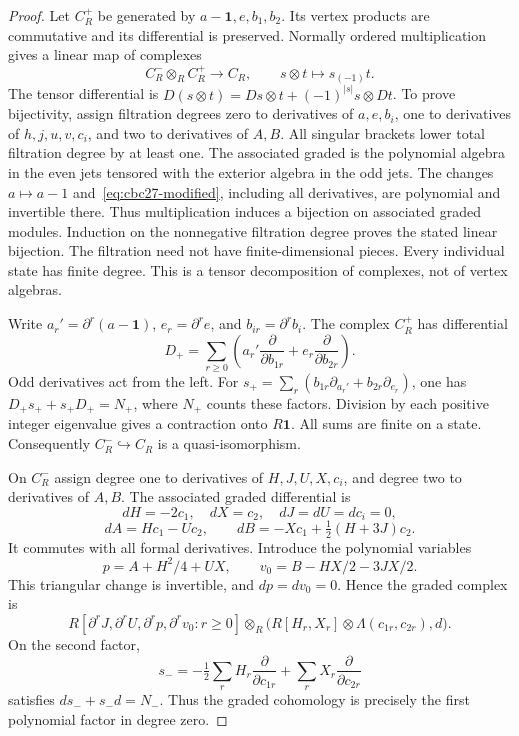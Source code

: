 \begin{proof}
Let $C_R^+$ be generated by $a-\mathbf1,e,b_1,b_2$.
Its vertex products are commutative and its differential is preserved.
Normally ordered multiplication gives a linear map of complexes
\[
 C_R^-\otimes_R C_R^+\longrightarrow C_R,\qquad
 s\otimes t\longmapsto s_{(-1)}t.
\]
The tensor differential is $D(s\otimes t)=Ds\otimes t+(-1)^{|s|}s\otimes Dt$.
To prove bijectivity, assign filtration degrees zero to derivatives of $a,e,b_i$, one to derivatives of $h,j,u,v,c_i$, and two to derivatives of $A,B$.
All singular brackets lower total filtration degree by at least one.
The associated graded is the polynomial algebra in the even jets tensored with the exterior algebra in the odd jets.
The changes $a\mapsto a-1$ and~\eqref{eq:cbc27-modified}, including all derivatives, are polynomial and invertible there.
Thus multiplication induces a bijection on associated graded modules.
Induction on the nonnegative filtration degree proves the stated linear bijection.
The filtration need not have finite-dimensional pieces.
Every individual state has finite degree.
This is a tensor decomposition of complexes, not of vertex algebras.

Write $a_r'=\partial^r(a-\mathbf1)$, $e_r=\partial^re$, and $b_{ir}=\partial^rb_i$.
The complex $C_R^+$ has differential
\[
 D_+=\sum_{r\geq0}\left(a_r'\frac{\partial}{\partial b_{1r}}+
 e_r\frac{\partial}{\partial b_{2r}}\right).
\]
Odd derivatives act from the left.
For $s_+=\sum_r(b_{1r}\partial_{a_r'}+b_{2r}\partial_{e_r})$, one has
$D_+s_++s_+D_+=N_+$, where $N_+$ counts these factors.
Division by each positive integer eigenvalue gives a contraction onto $R\mathbf1$.
All sums are finite on a state.
Consequently $C_R^-\hookrightarrow C_R$ is a quasi-isomorphism.

On $C_R^-$ assign degree one to derivatives of $H,J,U,X,c_i$, and degree two to derivatives of $A,B$.
The associated graded differential is
\[
 dH=-2c_1,\quad dX=c_2,\quad dJ=dU=dc_i=0,
\]
\[
 dA=Hc_1-Uc_2,\qquad dB=-Xc_1+\tfrac12(H+3J)c_2.
\]
It commutes with all formal derivatives.
Introduce the polynomial variables
\[
 p=A+H^2/4+UX,\qquad
 v_0=B-HX/2-3JX/2.
\]
This triangular change is invertible, and $dp=dv_0=0$.
Hence the graded complex is
\[
 R[\partial^rJ,\partial^rU,\partial^rp,\partial^rv_0:r\geq0]
 \otimes_R
 \bigl(R[H_r,X_r]\otimes\Lambda(c_{1r},c_{2r}),d\bigr).
\]
On the second factor,
\[
 s_-=-\tfrac12\sum_rH_r\frac{\partial}{\partial c_{1r}}
       +\sum_rX_r\frac{\partial}{\partial c_{2r}}
\]
satisfies $ds_-+s_-d=N_-$.
Thus the graded cohomology is precisely the first polynomial factor in degree zero.


\end{proof}
